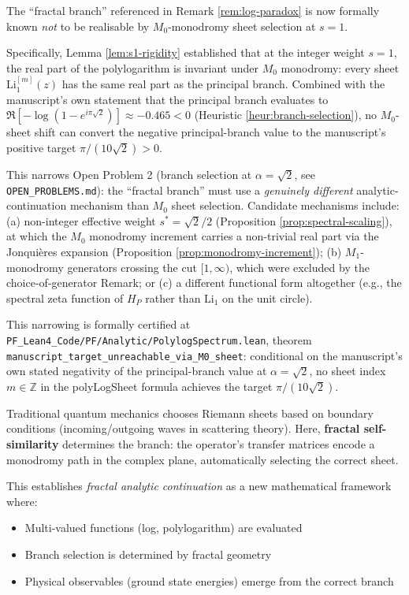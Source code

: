 \begin{remark}\label{rem:M0-narrowing}
The ``fractal branch'' referenced in Remark \ref{rem:log-paradox} is now formally known \emph{not} to be realisable by $M_0$-monodromy sheet selection at $s = 1$.

Specifically, Lemma \ref{lem:s1-rigidity} established that at the integer weight $s = 1$, the real part of the polylogarithm is invariant under $M_0$ monodromy: every sheet $\mathrm{Li}_1^{[m]}(z)$ has the same real part as the principal branch. Combined with the manuscript's own statement that the principal branch evaluates to $\Re[-\log(1 - e^{i\pi\sqrt{2}})] \approx -0.465 < 0$ (Heuristic \ref{heur:branch-selection}), no $M_0$-sheet shift can convert the negative principal-branch value to the manuscript's positive target $\pi/(10\sqrt{2}) > 0$.

This narrows Open Problem 2 (branch selection at $\alpha = \sqrt{2}$, see \texttt{OPEN\_PROBLEMS.md}): the ``fractal branch'' must use a \emph{genuinely different} analytic-continuation mechanism than $M_0$ sheet selection. Candidate mechanisms include: (a) non-integer effective weight $s^* = \sqrt{2}/2$ (Proposition \ref{prop:spectral-scaling}), at which the $M_0$ monodromy increment carries a non-trivial real part via the Jonquières expansion (Proposition \ref{prop:monodromy-increment}); (b) $M_1$-monodromy generators crossing the cut $[1, \infty)$, which were excluded by the choice-of-generator Remark; or (c) a different functional form altogether (e.g., the spectral zeta function of $H_P$ rather than $\mathrm{Li}_1$ on the unit circle).

This narrowing is formally certified at \texttt{PF\_Lean4\_Code/PF/Analytic/PolylogSpectrum.lean}, theorem \texttt{manuscript\_target\_unreachable\_via\_M0\_sheet}: conditional on the manuscript's own stated negativity of the principal-branch value at $\alpha = \sqrt{2}$, no sheet index $m \in \mathbb{Z}$ in the polyLogSheet formula achieves the target $\pi/(10\sqrt{2})$.
\end{remark}

\begin{keyidea}
Traditional quantum mechanics chooses Riemann sheets based on boundary conditions (incoming/outgoing waves in scattering theory). Here, \textbf{fractal self-similarity} determines the branch: the operator's transfer matrices encode a monodromy path in the complex plane, automatically selecting the correct sheet.

This establishes \textit{fractal analytic continuation} as a new mathematical framework where:
\begin{itemize}
\item Multi-valued functions (log, polylogarithm) are evaluated
\item Branch selection is determined by fractal geometry
\item Physical observables (ground state energies) emerge from the correct branch
\end{itemize}
\end{keyidea}

